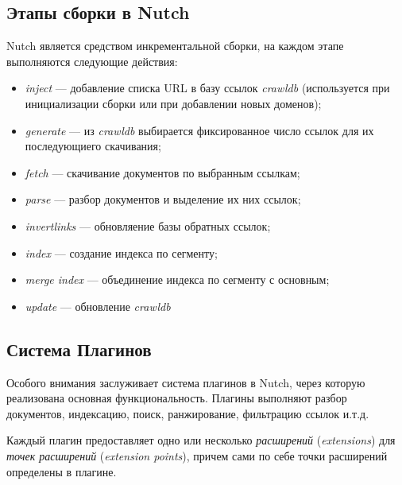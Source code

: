 \subsection{Этапы сборки в Nutch}
Nutch является средством инкрементальной сборки, на каждом этапе выполняются следующие действия:
\begin{itemize}
 \item \textit{inject} --- добавление списка URL в базу ссылок \textit{crawldb} (используется при инициализации сборки или при добавлении новых доменов);
 \item \textit{generate} --- из \textit{crawldb} выбирается фиксированное число ссылок для их последующиего скачивания;
 \item \textit{fetch} --- скачивание документов по выбранным ссылкам;
 \item \textit{parse} --- разбор документов и выделение их них ссылок;
 \item \textit{invertlinks} --- обновляение базы обратных ссылок;
 \item \textit{index} --- создание индекса по сегменту;
 \item \textit{merge index} --- объединение индекса по сегменту с основным;
 \item \textit{update} --- обновление \textit{crawldb}
\end{itemize}

\subsection{Система Плагинов}
Особого внимания заслуживает система плагинов в Nutch, через которую реализована основная функциональность. Плагины выполняют разбор документов, индексацию, поиск, ранжирование, фильтрацию ссылок и.т.д.

Каждый плагин предоставляет одно или несколько \textit{расширений} (\textit{extensions}) для \textit{точек расширений} (\textit{extension points}), причем сами по себе точки расширений определены в плагине.
